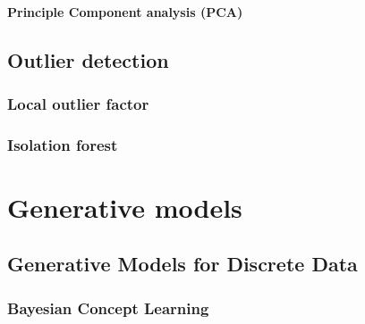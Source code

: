 \documentclass[
]{book}
\begin{document}
\hypertarget{principle-component-analysis-pca}{%
\subsubsection{Principle Component analysis (PCA)}\label{principle-component-analysis-pca}}

\hypertarget{outlier-detection}{%
\section{Outlier detection}\label{outlier-detection}}

\hypertarget{local-outlier-factor}{%
\subsection{Local outlier factor}\label{local-outlier-factor}}

\hypertarget{isolation-forest}{%
\subsection{Isolation forest}\label{isolation-forest}}

\hypertarget{generative-models}{%
\chapter{Generative models}\label{generative-models}}

\hypertarget{generative-models-for-discrete-data}{%
\section{Generative Models for Discrete Data}\label{generative-models-for-discrete-data}}

\hypertarget{bayesian-concept-learning}{%
\subsection{Bayesian Concept Learning}\label{bayesian-concept-learning}}
\end{document}
